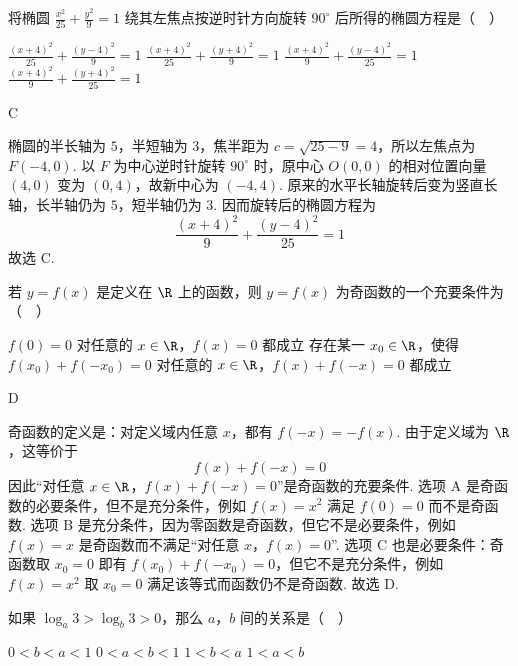 \documentclass[UTF8,a4paper,oneside,11pt]{ctexbook}
\begin{document}
\begin{problem}
将椭圆 \(\frac{x^2}{25}+\frac{y^2}{9}=1\) 绕其左焦点按逆时针方向旋转 \(90^\circ\) 后所得的椭圆方程是（\(\quad\)）

\choices
    {\(\frac{(x+4)^2}{25}+\frac{(y-4)^2}{9}=1\)}
    {\(\frac{(x+4)^2}{25}+\frac{(y+4)^2}{9}=1\)}
    {\(\frac{(x+4)^2}{9}+\frac{(y-4)^2}{25}=1\)}
    {\(\frac{(x+4)^2}{9}+\frac{(y+4)^2}{25}=1\)}
\end{problem}

\begin{answer}
C
\end{answer}

\begin{solution}
椭圆的半长轴为 \(5\)，半短轴为 \(3\)，焦半距为 \(c=\sqrt{25-9}=4\)，所以左焦点为 \(F(-4,0)\). 以 \(F\) 为中心逆时针旋转 \(90^\circ\) 时，原中心 \(O(0,0)\) 的相对位置向量 \((4,0)\) 变为 \((0,4)\)，故新中心为 \((-4,4)\). 原来的水平长轴旋转后变为竖直长轴，长半轴仍为 \(5\)，短半轴仍为 \(3\). 因而旋转后的椭圆方程为
\[
\frac{(x+4)^2}{9}+\frac{(y-4)^2}{25}=1
\]
故选 C.
\end{solution}

\begin{problem}
若 \(y=f(x)\) 是定义在 \(\R\) 上的函数，则 \(y=f(x)\) 为奇函数的一个充要条件为（\(\quad\)）

\choices
    {\(f(0)=0\)}
    {对任意的 \(x\in\R\)，\(f(x)=0\) 都成立}
    {存在某一 \(x_0\in\R\)，使得 \(f(x_0)+f(-x_0)=0\)}
    {对任意的 \(x\in\R\)，\(f(x)+f(-x)=0\) 都成立}
\end{problem}

\begin{answer}
D
\end{answer}

\begin{solution}
奇函数的定义是：对定义域内任意 \(x\)，都有 \(f(-x)=-f(x)\). 由于定义域为 \(\R\)，这等价于
\[
f(x)+f(-x)=0
\]
因此“对任意 \(x\in\R\)，\(f(x)+f(-x)=0\)”是奇函数的充要条件. 选项 A 是奇函数的必要条件，但不是充分条件，例如 \(f(x)=x^2\) 满足 \(f(0)=0\) 而不是奇函数. 选项 B 是充分条件，因为零函数是奇函数，但它不是必要条件，例如 \(f(x)=x\) 是奇函数而不满足“对任意 \(x\)，\(f(x)=0\)”. 选项 C 也是必要条件：奇函数取 \(x_0=0\) 即有 \(f(x_0)+f(-x_0)=0\)，但它不是充分条件，例如 \(f(x)=x^2\) 取 \(x_0=0\) 满足该等式而函数仍不是奇函数. 故选 D.
\end{solution}

\begin{problem}
如果 \(\log_a 3>\log_b 3>0\)，那么 \(a\)，\(b\) 间的关系是（\(\quad\)）

\choices
    {\(0<b<a<1\)}
    {\(0<a<b<1\)}
    {\(1<b<a\)}
    {\(1<a<b\)}
\end{problem}
\end{document}
